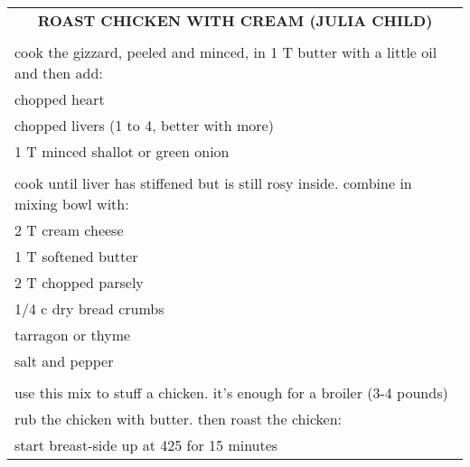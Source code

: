 \documentclass[8pt]{report}
\begin{document}
\begin{tabular}{|l|}
  \end{tabular}

\newpage

\centering

\begin{tabular}{|l|} \hline	%
 
\multicolumn{1}{|c|}{\textbf{ROAST CHICKEN WITH CREAM (JULIA CHILD)}}
\\
\\

\index{fish/meat!roast chicken with cream (julia child)} \index{roast
chicken with cream} \index{chicken!roast with cream}

cook the gizzard, peeled and minced, in 1 T butter with a little oil and then add:\\
\hspace{0.5 in}	chopped heart\\
\hspace{0.5 in}	chopped livers (1 to 4, better with more)\\
\hspace{0.5 in}	1 T minced shallot or green onion\\
\\
cook until liver has stiffened but is still rosy inside.  combine in mixing bowl with:\\
\hspace{0.5 in}	2 T cream cheese\\
\hspace{0.5 in}	1 T softened butter\\
\hspace{0.5 in}	2 T chopped parsely\\
\hspace{0.5 in}	1/4 c dry bread crumbs\\
\hspace{0.5 in}	tarragon or thyme\\
\hspace{0.5 in}	salt and pepper\\
\\
use this mix to stuff a chicken. it's enough for a broiler (3-4 pounds)\\
rub the chicken with butter.  then roast the chicken:\\
\hspace{0.5 in}	start breast-side up at 425 for 15 minutes\\

\end{tabular}
\end{document}
